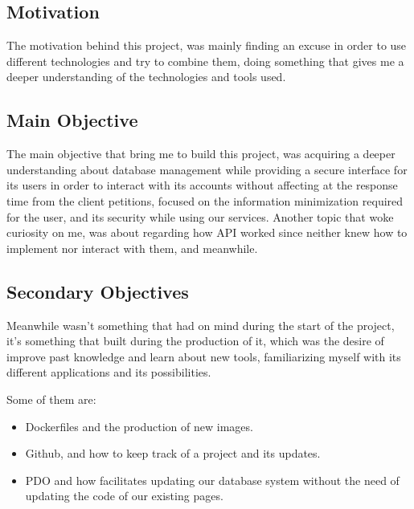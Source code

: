 \documentclass[11pt]{article}
\begin{document}
    \newpage
    \subsection{Motivation}\label{subsec:Motivation}

        The motivation behind this project, was mainly finding an excuse in order to use different technologies and
        try to combine them, doing something that gives me a deeper understanding of the technologies and tools used.

    \newpage
    \subsection{Main Objective}\label{subsec:MainObjective}

        The main objective that bring me to build this project, was acquiring a deeper understanding about database
        management while providing a secure interface for its users in order to interact with its accounts without
        affecting at the response time from the client petitions, focused on the information minimization required for
        the user, and its security while using our services.
        Another topic that woke curiosity on me, was about regarding how API worked since neither knew how to implement
        nor interact with them, and meanwhile.

    \newpage
    \subsection{Secondary Objectives}\label{subsec:SecondaryObjective}

        Meanwhile wasn't something that had on mind during the start of the project, it's something that built during
        the production of it, which was the desire of improve past knowledge and learn about new tools, familiarizing
        myself with its different applications and its possibilities.

        Some of them are:
        \begin{itemize}
            \item Dockerfiles and the production of new images.
            \item Github, and how to keep track of a project and its updates.
            \item PDO and how facilitates updating our database system without the need of updating the code of our
            existing pages.
        \end{itemize}
\end{document}
